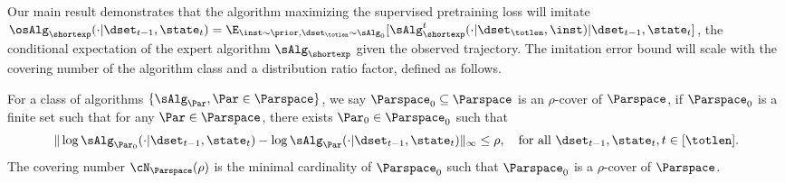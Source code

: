 \documentclass[10pt]{article}
\newcommand{\authnote}[2]{{\scriptsize $\ll$\textsf{#1 notes: #2}$\gg$}}
\newcommand{\authnote}[2]{}
\newcommand{\yub}[1]{{\color{red}\authnote{Yu}{#1}}}
\begin{document}


Our main result demonstrates that the algorithm maximizing the supervised pretraining loss will imitate $\osAlg_{\shortexp}(\cdot|\dset_{t-1},\state_t) = \E_{\inst\sim \prior,  \dset_{\totlen} \sim \sAlg_0}[\sAlg_{\shortexp}^t(\cdot|\dset_\totlen,\inst)|\dset_{t-1},\state_t]$, the conditional expectation of the expert algorithm $\sAlg_{\shortexp}$ given the observed trajectory. The imitation error bound will scale with the covering number of the algorithm class and a  distribution ratio factor, defined as follows.

\begin{definition}\label{def:cover_number_general} For a class of algorithms $\{\sAlg_\Par,\Par\in\Parspace\}$, 
we say $\Parspace_0 \subseteq\Parspace$ is an  $\rho$-cover of $\Parspace$, if $\Parspace_0$ is a finite set such that for any $\Par\in\Parspace$, there exists $\Par_0\in\Parspace_0$ such that 
\[
\|\log \sAlg_{\Par_0}(\cdot|\dset_{t-1},\state_t)-\log \sAlg_{\Par}(\cdot|\dset_{t-1},\state_t)\|_{\infty}\leq\rho,~~~ \text{for all } \dset_{t-1},\state_t, t\in[\totlen].
\]
The covering number $\cN_{\Parspace}(\rho)$ is the minimal cardinality of $\Parspace_0$ such that $\Parspace_0$ is a $\rho$-cover of $\Parspace$.
\end{definition}




\end{document}
